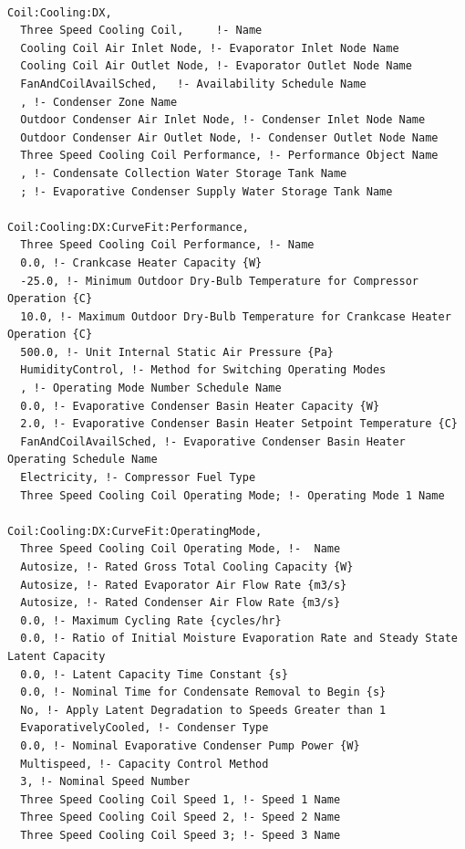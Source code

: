 \begin{lstlisting}

Coil:Cooling:DX,
  Three Speed Cooling Coil,     !- Name
  Cooling Coil Air Inlet Node, !- Evaporator Inlet Node Name
  Cooling Coil Air Outlet Node, !- Evaporator Outlet Node Name
  FanAndCoilAvailSched,   !- Availability Schedule Name
  , !- Condenser Zone Name
  Outdoor Condenser Air Inlet Node, !- Condenser Inlet Node Name
  Outdoor Condenser Air Outlet Node, !- Condenser Outlet Node Name
  Three Speed Cooling Coil Performance, !- Performance Object Name
  , !- Condensate Collection Water Storage Tank Name
  ; !- Evaporative Condenser Supply Water Storage Tank Name

Coil:Cooling:DX:CurveFit:Performance,
  Three Speed Cooling Coil Performance, !- Name
  0.0, !- Crankcase Heater Capacity {W}
  -25.0, !- Minimum Outdoor Dry-Bulb Temperature for Compressor Operation {C}
  10.0, !- Maximum Outdoor Dry-Bulb Temperature for Crankcase Heater Operation {C}
  500.0, !- Unit Internal Static Air Pressure {Pa}
  HumidityControl, !- Method for Switching Operating Modes
  , !- Operating Mode Number Schedule Name
  0.0, !- Evaporative Condenser Basin Heater Capacity {W}
  2.0, !- Evaporative Condenser Basin Heater Setpoint Temperature {C}
  FanAndCoilAvailSched, !- Evaporative Condenser Basin Heater Operating Schedule Name
  Electricity, !- Compressor Fuel Type
  Three Speed Cooling Coil Operating Mode; !- Operating Mode 1 Name

Coil:Cooling:DX:CurveFit:OperatingMode,
  Three Speed Cooling Coil Operating Mode, !-  Name
  Autosize, !- Rated Gross Total Cooling Capacity {W}
  Autosize, !- Rated Evaporator Air Flow Rate {m3/s}
  Autosize, !- Rated Condenser Air Flow Rate {m3/s}
  0.0, !- Maximum Cycling Rate {cycles/hr}
  0.0, !- Ratio of Initial Moisture Evaporation Rate and Steady State Latent Capacity
  0.0, !- Latent Capacity Time Constant {s}
  0.0, !- Nominal Time for Condensate Removal to Begin {s}
  No, !- Apply Latent Degradation to Speeds Greater than 1
  EvaporativelyCooled, !- Condenser Type
  0.0, !- Nominal Evaporative Condenser Pump Power {W}
  Multispeed, !- Capacity Control Method
  3, !- Nominal Speed Number
  Three Speed Cooling Coil Speed 1, !- Speed 1 Name
  Three Speed Cooling Coil Speed 2, !- Speed 2 Name
  Three Speed Cooling Coil Speed 3; !- Speed 3 Name


\end{lstlisting}
